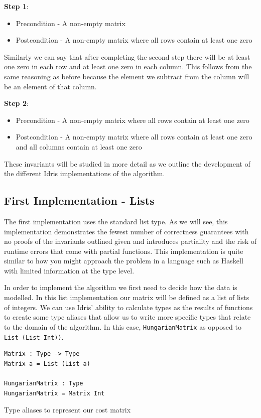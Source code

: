 \documentclass[a4paper, notitlepage]{report}
\begin{document}
\textbf{Step 1}:
\begin{itemize}
\item Precondition - A non-empty matrix
\item Postcondition - A non-empty matrix where all rows contain at least one zero
\end{itemize}

Similarly we can say that after completing the second step there will be at
least one zero in each row and at least one zero in each column. This follows
from the same reasoning as before because the element we subtract from the
column will be an element of that column.

\textbf{Step 2}:
\begin{itemize}
\item Precondition - A non-empty matrix where all rows contain at least one zero
\item Postcondition - A non-empty matrix where all rows contain at least one zero
and all columns contain at least one zero
\end{itemize}

These invariants will be studied in more detail as we outline the development of
the different Idris implementations of the algorithm.

\subsection{First Implementation - Lists}
\label{sec:orgbc4dbdf}
The first implementation uses the standard list type. As we will see, this
implementation demonstrates the fewest number of correctness guarantees with no
proofs of the invariants outlined given and introduces partiality and the risk
of runtime errors that come with partial functions. This implementation is quite
similar to how you might approach the problem in a language such as Haskell with
limited information at the type level.

In order to implement the algorithm we first need to decide how the data is
modelled. In this list implementation our matrix will be defined as a list of
lists of integers. We can use Idris' ability to calculate types as the results
of functions to create some type aliases that allow us to write more specific
types that relate to the domain of the algorithm. In this case, \texttt{HungarianMatrix}
as opposed to \texttt{List (List Int))}.

\begin{listing}[H]
\begin{verbatim}
Matrix : Type -> Type
Matrix a = List (List a)

HungarianMatrix : Type
HungarianMatrix = Matrix Int
\end{verbatim}
\caption{Type aliases to represent our cost matrix}
\end{listing}
\end{document}
